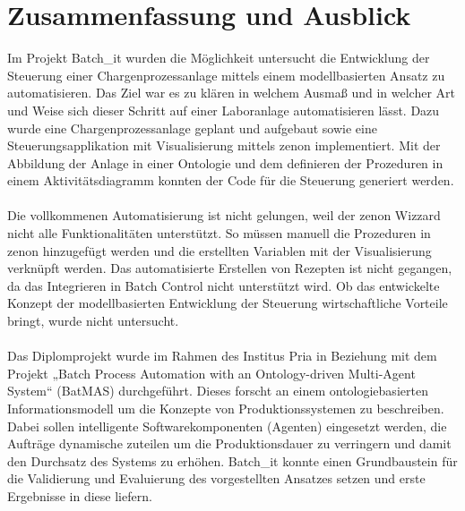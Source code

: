 

\chapter{Zusammenfassung und Ausblick} \label{chapter:conclusion}

Im Projekt Batch\_it wurden die Möglichkeit untersucht die Entwicklung der Steuerung einer Chargenprozessanlage mittels einem modellbasierten Ansatz zu automatisieren. Das Ziel war es zu klären in welchem Ausmaß und in welcher Art und Weise sich dieser Schritt auf einer Laboranlage automatisieren lässt. Dazu wurde eine Chargenprozessanlage geplant und aufgebaut sowie eine Steuerungsapplikation mit Visualisierung mittels zenon implementiert. 
Mit der Abbildung der Anlage in einer Ontologie und dem definieren der Prozeduren in einem Aktivitätsdiagramm konnten der Code für die Steuerung generiert werden. \\\\
Die vollkommenen Automatisierung ist nicht gelungen, weil der zenon Wizzard nicht alle Funktionalitäten unterstützt. So müssen manuell die Prozeduren in zenon hinzugefügt werden und die erstellten Variablen mit der Visualisierung verknüpft werden. Das automatisierte Erstellen von Rezepten ist nicht gegangen, da das Integrieren in Batch Control nicht unterstützt wird. Ob das entwickelte Konzept der modellbasierten Entwicklung der Steuerung wirtschaftliche Vorteile bringt, wurde nicht untersucht. \\\\
Das Diplomprojekt wurde im Rahmen des Institus Pria in Beziehung mit dem Projekt „Batch Process Automation with an On\-to\-lo\-gy-driven Multi-Agent System“ (BatMAS) durchgeführt. Dieses forscht an einem ontologiebasierten Informationsmodell um die Konzepte von Produktionssystemen zu beschreiben. Dabei sollen intelligente Softwarekomponenten (Agenten) eingesetzt werden, die Aufträge dynamische zuteilen um die Produktionsdauer zu verringern und damit den Durchsatz des Systems zu erhöhen. Batch\_it konnte einen Grundbaustein für die Validierung und Evaluierung des vorgestellten Ansatzes setzen und erste Ergebnisse in diese liefern.\\\\
